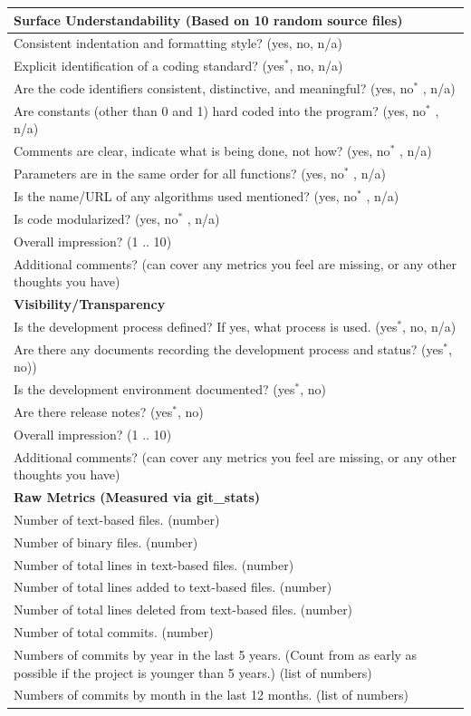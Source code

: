 \documentclass[letterpaper,cleveref]{lipics-v2019}
\begin{document}
\def\arraystretch{1.4}
\begin{tabular}{p{14cm}}
	\hline		
	\textbf{Surface Understandability (Based on 10 random source files)}\\
	\hline
	Consistent indentation and formatting style? ({yes, no, n/a})\\
	Explicit identification of a coding standard? ({yes$^*$, no, n/a})\\
	Are the code identifiers consistent, distinctive, and meaningful? ({yes, no$^*$ ,
	n/a})\\
	Are constants (other than 0 and 1) hard coded into the program? ({yes, no$^*$ ,
	n/a})\\
	Comments are clear, indicate what is being done, not how? ({yes, no$^*$ , n/a})\\
	Parameters are in the same order for all functions? ({yes, no$^*$ , n/a})\\
	Is the name/URL of any algorithms used mentioned? ({yes, no$^*$ , n/a})\\
	Is code modularized? ({yes, no$^*$ , n/a})\\
	Overall impression? ({1 .. 10})\\
	Additional comments? (can cover any metrics you feel are missing, or any other
	thoughts you have)\\
	\hline		
	\textbf{Visibility/Transparency}\\
	\hline
	Is the development process defined? If yes, what process is used. ({yes$^*$, no,
	n/a})\\
	Are there any documents recording the development process and status?  ({yes$^*$,
	no}))\\
	Is the development environment documented? ({yes$^*$, no})\\
	Are there release notes? ({yes$^*$, no})\\
	Overall impression? ({1 .. 10})\\
	Additional comments? (can cover any metrics you feel are missing, or any other
	thoughts you have)\\
	\hline		
	\textbf{Raw Metrics (Measured via git\_stats)}\\
	\hline
	Number of text-based files. (number)\\
	Number of binary files. (number)\\
	Number of total lines in text-based files. (number)\\
	Number of total lines added to text-based files. (number)\\
	Number of total lines deleted from text-based files. (number)\\
	Number of total commits. (number)\\
	Numbers of commits by year in the last 5 years. (Count from as early as
	possible if the project is younger than 5 years.) (list of numbers)\\
	Numbers of commits by month in the last 12 months. (list of numbers)\\
	\hline
\end{tabular}
\end{document}
